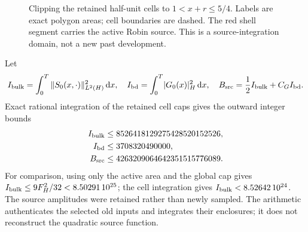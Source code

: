 \documentclass[11pt]{article}
\newcommand{\dd}{\,\mathrm d}
\newcommand{\norm}[1]{\lvert #1\rvert_H}
\begin{document}
\begin{figure}[htbp]
\centering
{}
\caption{Clipping the retained half-unit cells to
$1<x+r\le5/4$. Labels are exact polygon areas; cell boundaries are dashed.
The red shell segment carries the active Robin source.
This is a source-integration domain, not a new past development.}
\label{fig:cells}
\end{figure}

Let
\begin{equation}
 I_{\rm bulk}=\int_0^T\|S_0(x,\cdot)\|_{L^2(H)}^2\dd x,\quad
 I_{\rm bd}=\int_0^T\norm{G_0(x)}^2\dd x,\quad
 B_{\rm src}=\frac12 I_{\rm bulk}+C_G I_{\rm bd}.
\end{equation}
Exact rational integration of the retained cell caps gives the outward
integer bounds
\begin{equation}
\begin{aligned}
 I_{\rm bulk}&\le 8526418129275428520152526,\\
 I_{\rm bd}&\le 3708320490000,\\
 B_{\rm src}&\le4263209064642351515776089.
\end{aligned}
\label{eq:ledgerintegers}
\end{equation}
For comparison, using only the active area and the global cap gives
$I_{\rm bulk}\le9F_H^2/32<8.50291\,10^{25}$; the cell integration
gives $I_{\rm bulk}<8.52642\,10^{24}$.
The source amplitudes were retained rather than newly sampled.
The arithmetic authenticates the selected old inputs and integrates their
enclosures; it does not reconstruct the quadratic source function.
\end{document}
